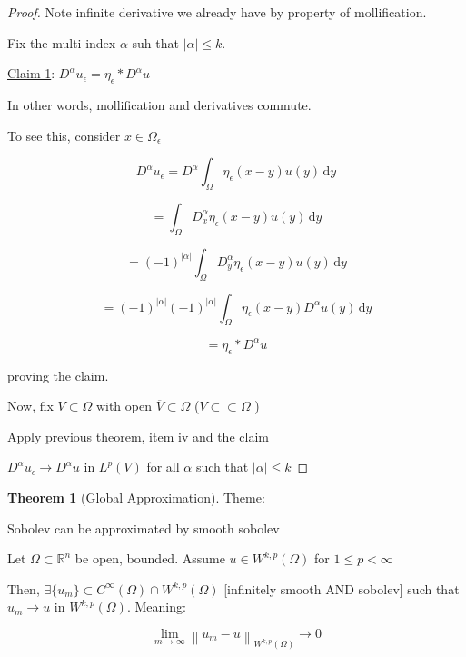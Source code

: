 \documentclass{article}
\theoremstyle{definition}
\newtheorem{theorem}{Theorem}
\begin{document}
\begin{proof}

    Note infinite derivative we already have by property of mollification.

    Fix the multi-index \(\alpha\) suh that \(\vert \alpha \vert \leq k\).

    \underline{Claim 1}: \(D^\alpha u_{\epsilon} = \eta_{\epsilon} \ast D^\alpha u \)
    
    In other words, mollification and derivatives commute.

    To see this, consider \(x\in \Omega_{\epsilon} \)

    \[
        D^\alpha u_{\epsilon} = D^\alpha \int_{\Omega} \eta _\epsilon (x-y) u(y) \,\mathrm{d}y 
    \]

    \[
        = \int_{\Omega} D^\alpha_x \eta_{\epsilon} (x-y) u(y) \,\mathrm{d}y 
    \]

    \[
        = (-1)^{\vert \alpha  \vert } \int_{\Omega} D^\alpha_y \eta_{\epsilon} (x-y) u(y) \,\mathrm{d}y 
    \]

    \[
        = (-1)^{\vert \alpha \vert } (-1)^{\vert \alpha \vert } \int_{\Omega} \eta_{\epsilon} (x-y) D^\alpha u(y) \,\mathrm{d}y 
    \]

    \[
        = \eta_{\epsilon } \ast D^\alpha u
    \]

    proving the claim.

    Now, fix \(V \subset \Omega\) with open \(\overline{V} \subset \Omega\) (\(V \subset \subset \Omega\) )

    Apply previous theorem, item iv and the claim

    \(D^\alpha u_{\epsilon} \to D^\alpha u\) in \(L^p(V)\) for all \(\alpha \) such that \(\vert \alpha  \vert \leq k\) 

\end{proof}

\begin{theorem}
    [Global Approximation]

    Theme:

    Sobolev can be approximated by smooth sobolev

    Let \(\Omega \subset \mathbb{R}^n\) be open, bounded. Assume \(u\in W^{k,p}(\Omega)\) for \(1 \leq p < \infty\) 
    
    Then, \(\exists \{ u_m \} \subset C^{\infty}(\Omega) \cap W^{k,p} (\Omega)\) [infinitely smooth AND sobolev] such that \(u_m \to u\) in \(W^{k,p}(\Omega)\). Meaning:

    \[
        \lim_{m \to \infty} \left\lVert u_m - u \right\rVert _{W^{k,p}(\Omega)} \to 0
    \]

\end{theorem}
\end{document}
